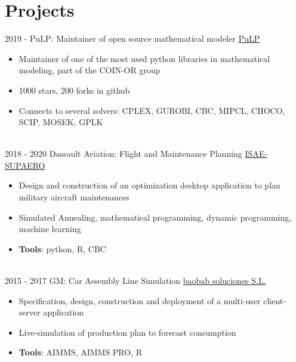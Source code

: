 \documentclass[letterpaper]{twentysecondcv} %
\begin{document}
\section{Projects}
\begin{twenty}
	\twentyitem
    	{2019 - }
		{}
        {PuLP: Maintainer of open source mathematical modeler}
        {\href{https://github.com/coin-or/pulp}{PuLP}}
        {}
        {
        {\begin{itemize}
        \item Maintainer of one of the most used python libraries in mathematical modeling, part of the COIN-OR group
        \item 1000 stars, 200 forks in github
        \item Connects to several solvers: CPLEX, GUROBI, CBC, MIPCL, CHOCO, SCIP, MOSEK, GPLK
        \vspace{2mm}
		    \end{itemize}}
        }
  \\
  \twentyitem
      {2018 - 2020}
    {}
        {Dassault Aviation: Flight and Maintenance Planning}
        {\href{https://www.isae-supaero.fr/en/}{ISAE-SUPAERO}}
        {}
        {
        {\begin{itemize}
        \item Design and construction of an optimization desktop application to plan military aircraft maintenances
        \item Simulated Annealing, mathematical programming, dynamic programming, machine learning
        \item \textbf{Tools}: python, R, CBC
        \vspace{2mm}
        \end{itemize}}
        }
  \\
  \twentyitem
      {2015 - 2017}
    {}
        {GM: Car Assembly Line Simulation}
        {\href{https://baobabsoluciones.es/en/}{baobab soluciones S.L.}}
        {}
        {
        {\begin{itemize}
        \item Specification, design, construction and deployment of a multi-user client-server application
        \item Live-simulation of production plan to forecast consumption
        \item \textbf{Tools}: AIMMS, AIMMS PRO, R
        \vspace{2mm}
        \end{itemize}}
        }
  \\

\end{twenty}
\end{document}
